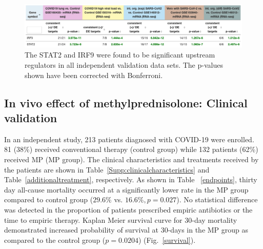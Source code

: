 \begin{figure}
\centering
	\includegraphics[width=1\linewidth]{../Figures/STAT2-IRF9validation.png}
    \caption{The STAT2 and IRF9 were found to be significant upstream regulators in all independent validation data sets. The p-values shown have been corrected with Bonferroni.}
        \label{Supp:STAT2-IRF9validation}
\end{figure}

\subsection{In vivo effect of methylprednisolone: Clinical validation}

In an independent study, 213 patients diagnosed with COVID-19 were enrolled. 81 (38\%) received conventional therapy (control group) while 132 patients (62\%) received MP (MP group). The clinical characteristics and treatments received by the patients are shown in Table~\ref{Supp:clinicalcharacteristics} and Table~\ref{additionaltreatment}, respectively. As shown in Table ~\ref{endpoints}, thirty day all-cause mortality occurred at a significantly lower rate in the MP group compared to control group ($29.6\%$ vs. $16.6\%, p=0.027$). No statistical difference was detected in the proportion of patients prescribed empiric antibiotics or the time to empiric therapy. Kaplan Meier survival curve for 30-day mortality demonstrated increased probability of survival at 30-days in the MP group as compared to the control group ($p= 0.0204$) (Fig.~\ref{survival}).



